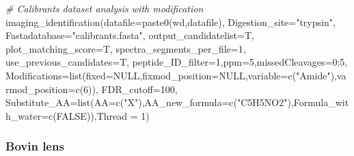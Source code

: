 \documentclass[
]{article}
\newenvironment{Shaded}{\begin{snugshade}}{\end{snugshade}}
\newcommand{\AttributeTok}[1]{\textcolor[rgb]{0.77,0.63,0.00}{#1}}
\newcommand{\CommentTok}[1]{\textcolor[rgb]{0.56,0.35,0.01}{\textit{#1}}}
\newcommand{\ConstantTok}[1]{\textcolor[rgb]{0.00,0.00,0.00}{#1}}
\newcommand{\DecValTok}[1]{\textcolor[rgb]{0.00,0.00,0.81}{#1}}
\newcommand{\FunctionTok}[1]{\textcolor[rgb]{0.00,0.00,0.00}{#1}}
\newcommand{\NormalTok}[1]{#1}
\newcommand{\SpecialCharTok}[1]{\textcolor[rgb]{0.00,0.00,0.00}{#1}}
\newcommand{\StringTok}[1]{\textcolor[rgb]{0.31,0.60,0.02}{#1}}
\begin{document}
\begin{Shaded}
\begin{Highlighting}[]
\CommentTok{\# Calibrants dataset analysis with modification }
\FunctionTok{imaging\_identification}\NormalTok{(}\AttributeTok{datafile=}\FunctionTok{paste0}\NormalTok{(wd,datafile),}
  \AttributeTok{Digestion\_site=}\StringTok{"trypsin"}\NormalTok{,}
  \AttributeTok{Fastadatabase=}\StringTok{"calibrants.fasta"}\NormalTok{,}
  \AttributeTok{output\_candidatelist=}\NormalTok{T,}
  \AttributeTok{plot\_matching\_score=}\NormalTok{T,}
  \AttributeTok{spectra\_segments\_per\_file=}\DecValTok{1}\NormalTok{,}
  \AttributeTok{use\_previous\_candidates=}\NormalTok{T,}
  \AttributeTok{peptide\_ID\_filter=}\DecValTok{1}\NormalTok{,}\AttributeTok{ppm=}\DecValTok{5}\NormalTok{,}\AttributeTok{missedCleavages=}\DecValTok{0}\SpecialCharTok{:}\DecValTok{5}\NormalTok{,}
  \AttributeTok{Modifications=}\FunctionTok{list}\NormalTok{(}\AttributeTok{fixed=}\ConstantTok{NULL}\NormalTok{,}\AttributeTok{fixmod\_position=}\ConstantTok{NULL}\NormalTok{,}\AttributeTok{variable=}\FunctionTok{c}\NormalTok{(}\StringTok{"Amide"}\NormalTok{),}\AttributeTok{varmod\_position=}\FunctionTok{c}\NormalTok{(}\DecValTok{6}\NormalTok{)),}
  \AttributeTok{FDR\_cutoff=}\DecValTok{100}\NormalTok{,}
  \AttributeTok{Substitute\_AA=}\FunctionTok{list}\NormalTok{(}\AttributeTok{AA=}\FunctionTok{c}\NormalTok{(}\StringTok{"X"}\NormalTok{),}\AttributeTok{AA\_new\_formula=}\FunctionTok{c}\NormalTok{(}\StringTok{"C5H5NO2"}\NormalTok{),}\AttributeTok{Formula\_with\_water=}\FunctionTok{c}\NormalTok{(}\ConstantTok{FALSE}\NormalTok{)),}\AttributeTok{Thread =} \DecValTok{1}\NormalTok{)}
\end{Highlighting}
\end{Shaded}

\hypertarget{bovin-lens}{%
\subsubsection{Bovin lens}\label{bovin-lens}}
\end{document}
